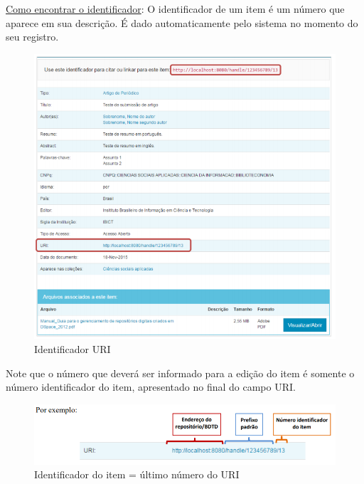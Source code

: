 \documentclass[12pt,hidelinks]{article}
\begin{document}
\newpage
    
    \underline{Como encontrar o identificador}: O identificador de um item é um número que aparece em sua descrição. É dado automaticamente pelo sistema no momento do seu registro.
    
    \begin{figure}[!htp]
                \centering
                \includegraphics[scale=0.8]{figura/Figura87.png}
                \caption{Identificador URI}
            \label{Rotulo}
        \end{figure}
    
    Note que o número que deverá ser informado para a edição do item é somente o número identificador do item, apresentado no final do campo URI. 
    
    \begin{figure}[!htp]
                \centering
                \includegraphics[scale=0.8]{figura/Figura88.png}
                \caption{Identificador do item = último número do URI}
            \label{Rotulo}
        \end{figure}
\end{document}
